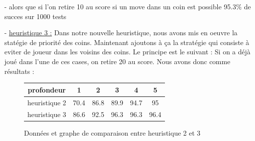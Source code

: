 \documentclass{report}
\begin{document}
- alors que si l'on retire 10 au score si un move dans un coin est possible
95.3\% de succes sur 1000 tests


- \underline{heuristique 3 :}
Dans notre nouvelle heuristique, nous avons mis en oeuvre la statégie de priorité des coins. Maintenant ajoutons à ça la stratégie qui consiste à eviter de joueur dans les voisins des coins. Le principe est le suivant : Si on a déjà joué dans l'une de ces cases, on retire 20 au score.
\newline
Nous avons donc comme résultats :

\begin{figure}[!h]
\begin{center}
\renewcommand{\arraystretch} {1.5}
    \begin{tabular}{c|c|c|c|c|c|}
        profondeur & 1 & 2 & 3 & 4 & 5 \\
        \hline
        heuristique 2 & 70.4 & 86.8 & 89.9 & 94.7 & 95\\
        \hline
        heuristique 3 & 86.6 & 92.5 & 96.3 & 96.3 & 96.4\\
        \hline
    \end{tabular}
\end{center}
\begin{center}
\caption{Données et graphe de comparaison entre heuristique 2 et 3}
\end{center}

\end{figure}
\end{document}

